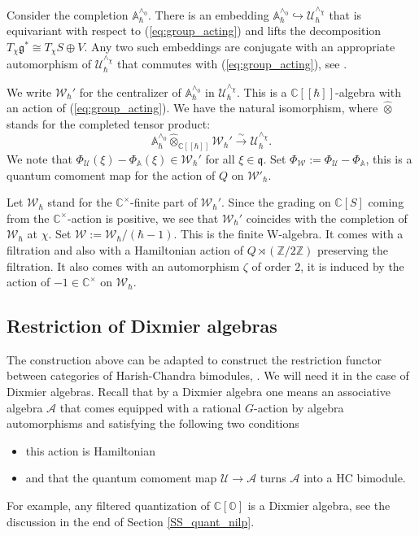 \documentclass[12pt]{amsart}
\newcommand{\C}{\mathbb{C}}
\newcommand{\A}{\mathcal{A}}
\newcommand{\U}{\mathcal{U}}
\newcommand{\g}{\mathfrak{g}}
\newcommand{\Orb}{\mathbb{O}}
\newcommand{\Walg}{\mathcal{W}}
\newcommand{\Z}{\mathbb{Z}}
\newcommand{\q}{\mathfrak{q}}
\newcommand{\Weyl}{\mathbb{A}}
\theoremstyle{definition}
\numberwithin{equation}{section}
\begin{document}
Consider the completion $\Weyl_\hbar^{\wedge_0}$. There is an embedding
$\Weyl_\hbar^{\wedge_0}\hookrightarrow \U_\hbar^{\wedge_\chi}$ that is
equivariant with respect to (\ref{eq:group_acting}) and lifts the decomposition
$T_\chi\g^*\cong T_\chi S\oplus V$. Any two such embeddings are conjugate with
an appropriate automorphism of $\U^{\wedge_\chi}_\hbar$ that commutes with
(\ref{eq:group_acting}), see \cite[Section 2.1]{W_prim}.

We write $\Walg_\hbar'$ for the centralizer of $\Weyl_\hbar^{\wedge_0}$
in $\U_\hbar^{\wedge_\chi}$. This is a $\C[[\hbar]]$-algebra with an action of
(\ref{eq:group_acting}). We have the natural isomorphism, where $\widehat{\otimes}$
stands for the completed tensor product:
\begin{equation}\label{eq:decomp_U}
\Weyl_\hbar^{\wedge_0}\widehat{\otimes}_{\C[[\hbar]]}\Walg_\hbar'
\xrightarrow{\sim} \U_\hbar^{\wedge_\chi}.
\end{equation}
We note that $\Phi_\U(\xi)-\Phi_\Weyl(\xi)\in \Walg_\hbar'$ for all
$\xi\in \q$. Set $\Phi_\Walg:=\Phi_\U-\Phi_{\Weyl}$, this is
a quantum comoment map for the action of $Q$ on $\Walg'_\hbar$.


Let $\Walg_\hbar$ stand for the $\C^\times$-finite part of $\Walg_\hbar'$.
Since the grading on $\C[S]$ coming from the $\C^\times$-action is positive,
we see that $\Walg_\hbar'$ coincides with the completion of $\Walg_\hbar$
at $\chi$. Set $\Walg:=\Walg_\hbar/(\hbar-1)$. This is the finite W-algebra.
It comes with a filtration and also with a Hamiltonian action of $Q\rtimes (\Z/2\Z)$
preserving the filtration. It also comes with an automorphism $\zeta$ of order $2$,
it is induced by the action of $-1\in \C^\times$ on $\Walg_\hbar$.

\subsection{Restriction of Dixmier algebras}\label{SS_Dixmier_restriction}
The construction above can be adapted to construct the restriction functor between
categories of Harish-Chandra bimodules, \cite[Section 3]{HC}. We will need it in the case of Dixmier algebras. Recall that by a Dixmier algebra one means an associative algebra $\A$ that comes equipped
with a rational $G$-action by algebra automorphisms and satisfying the following two conditions
\begin{itemize}
\item
this action is Hamiltonian
\item
and that the quantum comoment map $\U\rightarrow \A$ turns $\A$ into a HC bimodule.
\end{itemize}
For example,
any filtered quantization of $\C[\Orb]$ is a Dixmier algebra, see the discussion in the end of
Section \ref{SS_quant_nilp}.
\end{document}
